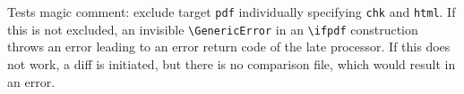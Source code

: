 \documentclass{article}
\begin{document}
Tests magic comment: exclude target \texttt{pdf} individually specifying \texttt{chk} and \texttt{html}. 
If this is not excluded, an invisible \texttt{\textbackslash{}GenericError} 
in an \texttt{\textbackslash{}ifpdf} construction throws an error leading to an error return code 
of the late processor. 
\ifpdf%
\else
\fi
If this does not work, a diff is initiated, but there is no comparison file, 
which would result in an error. 
\end{document}
